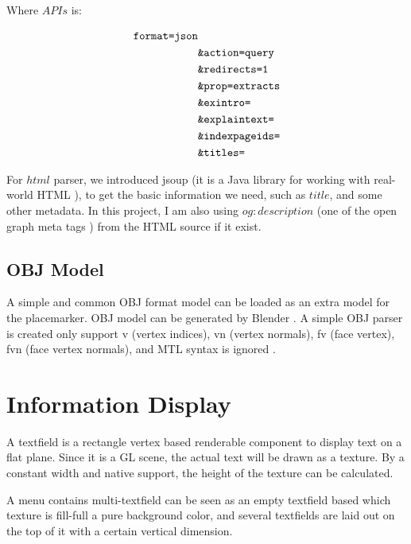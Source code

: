 Where $APIs$ is:

\[
\begin{array}{lr}
\begin{aligned}
\texttt{format=json}&\\
&\texttt{\&action=query}\\
&\texttt{\&redirects=1}\\
&\texttt{\&prop=extracts}\\
&\texttt{\&exintro=}\\
&\texttt{\&explaintext=}\\
&\texttt{\&indexpageids=}\\
&\texttt{\&titles=}\\
\end{aligned}
\end{array}
\]

For $html$ parser, we introduced jsoup (it is a Java library for working with real-world HTML \cite{joup.2016}), to get the basic information we need, such as $title$, and some other metadata. In this project, I am also using $og:description$ (one of the open graph meta tags \cite{ogp.2014}) from the HTML source if it exist.

\subsection{OBJ Model}
\label{section:obj-model}

A simple and common OBJ format model can be loaded as an extra model for the placemarker. OBJ model can be generated by Blender \cite{blender.2016}.  A simple OBJ parser is created only support v (vertex indices), vn (vertex normals), fv (face vertex), fvn (face vertex normals), and MTL syntax is ignored \cite{shen.obj-parser.2011}.

\section{Information Display}

A textfield is a rectangle vertex based renderable component to display text on a flat plane. Since it is a GL scene, the actual text will be drawn as a texture. By a constant width and native  support, the height of the texture can be calculated. 

A menu contains multi-textfield can be seen as an empty textfield based which texture is fill-full a pure background color, and several  textfields are laid out on the top of it with a certain vertical dimension.


